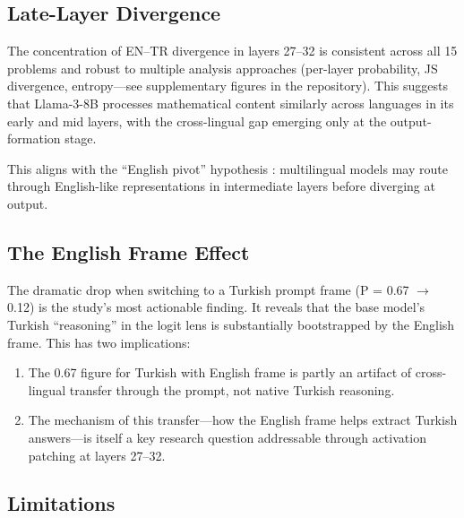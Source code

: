 \documentclass[11pt,a4paper]{article}
\begin{document}
\subsection{Late-Layer Divergence}

The concentration of EN--TR divergence in layers 27--32 is consistent across all 15 problems and robust to multiple analysis approaches (per-layer probability, JS divergence, entropy---see supplementary figures in the repository).
This suggests that Llama-3-8B processes mathematical content similarly across languages in its early and mid layers, with the cross-lingual gap emerging only at the output-formation stage.

This aligns with the ``English pivot'' hypothesis \citep{wendler2024}: multilingual models may route through English-like representations in intermediate layers before diverging at output.

\subsection{The English Frame Effect}

The dramatic drop when switching to a Turkish prompt frame (P = 0.67 $\rightarrow$ 0.12) is the study's most actionable finding.
It reveals that the base model's Turkish ``reasoning'' in the logit lens is substantially bootstrapped by the English frame.
This has two implications:
\begin{enumerate}[nosep]
    \item The 0.67 figure for Turkish with English frame is partly an artifact of cross-lingual transfer through the prompt, not native Turkish reasoning.
    \item The mechanism of this transfer---how the English frame helps extract Turkish answers---is itself a key research question addressable through activation patching at layers 27--32.
\end{enumerate}

\subsection{Limitations}
\end{document}
